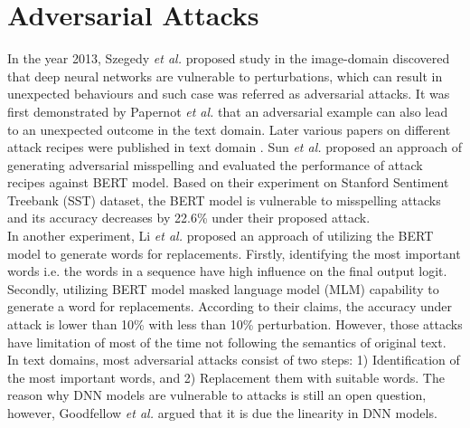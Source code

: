 \documentclass[%
	BCOR=8mm, %
	DIV=12,
	toc=bibliography, %
	toc=listof, %
	oneside, %
	egregdoesnotlikesansseriftitles, %
	]{scrbook}
\begin{document}
\section{Adversarial Attacks}
\label{section:advattacks}
In the year 2013, Szegedy \textit{et al.} \cite{szegedy_intriguing_2014} proposed study in the image-domain discovered that deep neural networks are vulnerable to perturbations, which can result in unexpected behaviours and such case was referred as adversarial attacks. It was first demonstrated by Papernot \textit{et al.}  \cite{papernot_crafting_2016} that an adversarial example can also lead to an unexpected outcome in the text domain. Later various papers on different attack recipes were published in text domain \cite{alzantot_generating_2018,li_bert-attack_2020,gao_black-box_2018,li_bert-attack_2020,ren_generating_2019,garg_bae_2020,chen_robustness_2019}.  Sun \textit{et al.}  \cite{sun_adv-bert_2020} proposed an approach of  generating adversarial misspelling and evaluated the performance of  attack recipes  against BERT model. Based on their experiment on Stanford Sentiment Treebank (SST) dataset, the BERT model is vulnerable to misspelling attacks and its accuracy decreases by 22.6\% under their proposed attack.\\
In another experiment, Li \textit{et al.} \cite{li_bert-attack_2020} proposed an approach of utilizing the BERT model to generate words for replacements. Firstly, identifying the most important words i.e. the words in a sequence have high influence on the final output logit. Secondly, utilizing BERT model masked language model (MLM) capability to generate a word for replacements. According to their claims, the accuracy under attack is lower than 10\% with less than 10\% perturbation. However, those attacks have limitation of most of the time not following the semantics of original text. \\
In text domains, most adversarial attacks consist of two steps: 1) Identification of the most important words, and 2) Replacement them with suitable words. The reason why DNN models are vulnerable to attacks is still an open question, however, Goodfellow \textit{et al.} \cite{goodfellow_explaining_2015} argued that it is due the linearity in DNN models.
\end{document}
